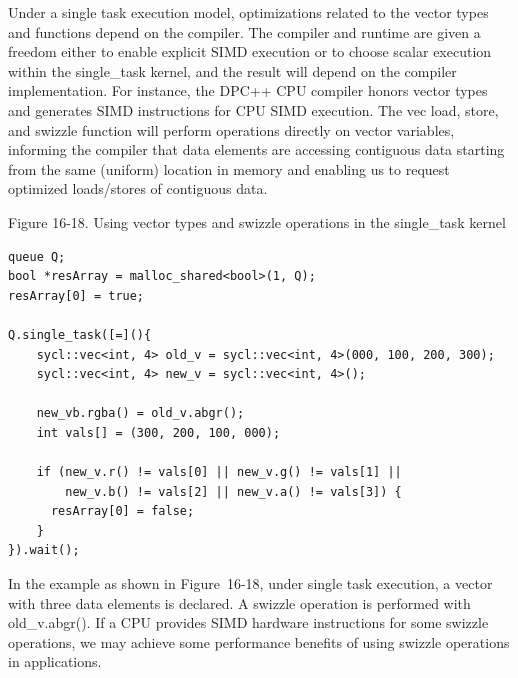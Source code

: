 Under a single task execution model, optimizations related to the vector types and functions depend on the compiler. The compiler and runtime are given a freedom either to enable explicit SIMD execution or to choose scalar execution within the single\_task kernel, and the result will depend on the compiler implementation. For instance, the DPC++ CPU compiler honors vector types and generates SIMD instructions for CPU SIMD execution. The vec load, store, and swizzle function will perform operations directly on vector variables, informing the compiler that data elements are accessing contiguous data starting from the same (uniform) location in memory and enabling us to request optimized loads/stores of contiguous data.\par

\hspace*{\fill} \par %
Figure 16-18. Using vector types and swizzle operations in the single\_task kernel
\begin{lstlisting}[caption={}]
queue Q;
bool *resArray = malloc_shared<bool>(1, Q);
resArray[0] = true;

Q.single_task([=](){
	sycl::vec<int, 4> old_v = sycl::vec<int, 4>(000, 100, 200, 300);
	sycl::vec<int, 4> new_v = sycl::vec<int, 4>();
	
	new_vb.rgba() = old_v.abgr();
	int vals[] = (300, 200, 100, 000);
	
	if (new_v.r() != vals[0] || new_v.g() != vals[1] ||
	    new_v.b() != vals[2] || new_v.a() != vals[3]) {
      resArray[0] = false;    
    }
}).wait();
\end{lstlisting}

In the example as shown in Figure 16-18, under single task execution, a vector with three data elements is declared. A swizzle operation is performed with old\_v.abgr(). If a CPU provides SIMD hardware instructions for some swizzle operations, we may achieve some performance benefits of using swizzle operations in applications.\par

